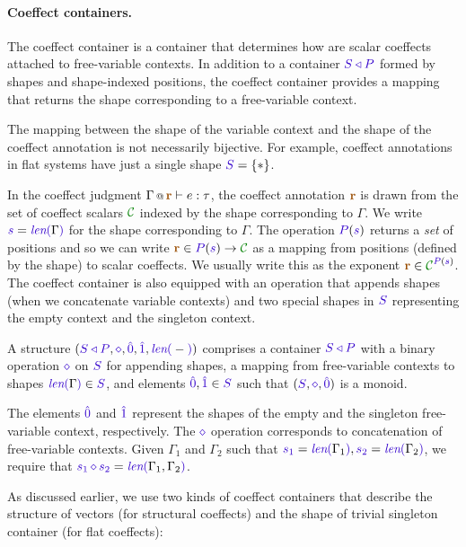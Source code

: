 \paragraph{Coeffect containers.}
The coeffect container is a container that determines how are scalar coeffects attached to
free-variable contexts. In addition to a container $\SHP$ formed by shapes and shape-indexed positions,
the coeffect container provides a mapping that returns the shape corresponding to a free-variable context.

The mapping between the shape of the variable context and the shape of the coeffect annotation
is not necessarily bijective. For example, coeffect annotations in flat systems have just a single
shape $\SH = \{ \ast \}$.

In the coeffect judgment $\coctx{\Gamma}{\aclrd{\textbf{r}}} \vdash e : \tau$, the coeffect annotation
$\aclrd{\textbf{r}}$ is drawn from the set of coeffect scalars $\C$ indexed by the shape corresponding
to $\Gamma$. We write $\sclrd{s} = \slen{\Gamma}$ for the shape corresponding to $\Gamma$. The operation
$\SP(\sclrd{s})$ returns a \emph{set} of positions and so we can write $\aclrd{\textbf{r}} \in
  \SP(\sclrd{s}) \rightarrow \C$  as a mapping from positions (defined by the shape) to scalar coeffects.
We usually write this as the exponent $\aclrd{\textbf{r}} \in \C^{\SP(\sclrd{s})}$.
The coeffect container is also equipped with an operation that appends shapes (when we concatenate
variable contexts) and two special shapes in $\SH$ representing the empty context and the singleton
context.

\begin{definition}
A \emph{} structure $(\SHP, \stimes, \sempty, \sunit, \slen{-})$
comprises a container $\SHP$ with a binary operation $\stimes$ on $\SH$ for appending shapes, a
mapping from free-variable contexts to shapes $\slen{\Gamma} \in \SH$, and elements $\sempty,\sunit \in
\SH$ such that $(\SH, \stimes, \sempty)$ is a monoid.

The elements $\sempty$ and $\sunit$ represent the shapes of the empty and the singleton free-variable
context, respectively. The $\stimes$ operation corresponds to concatenation of free-variable contexts.
Given $\Gamma_1$ and $\Gamma_2$ such that $\sclrd{s_1}=\slen{\Gamma_1}, \sclrd{s_2}=\slen{\Gamma_2}$,
we require that $\sclrd{s_1}\,\stimes\,\sclrd{s_2}=\slen{\Gamma_1, \Gamma_2}$.
\end{definition}

\noindent
As discussed earlier, we use two kinds of coeffect containers that describe the structure of vectors
(for structural coeffects) and the shape of trivial singleton container (for flat coeffects):

